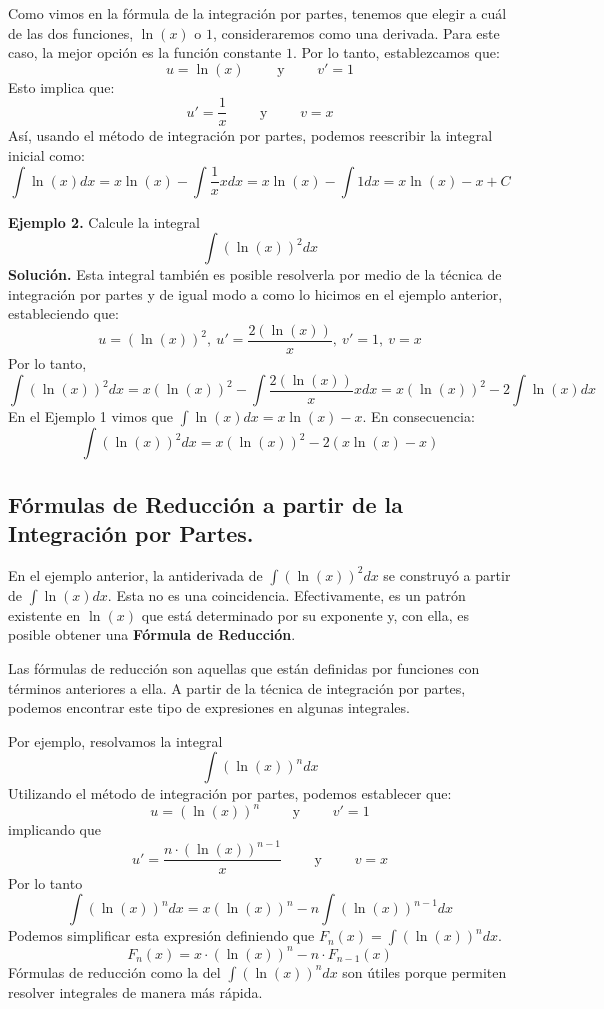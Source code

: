 \documentclass[12pt]{article}
\begin{document}
Como vimos en la fórmula de la integración por partes, tenemos que elegir a cuál de las dos funciones, $\ln(x)$ o $1$, consideraremos como una derivada. Para este caso, la mejor opción es la función constante $1$. Por lo tanto, establezcamos que:
\[
  u = \ln(x) \qquad \text{ y } \qquad v' = 1
\]
Esto implica que:
\[
  u' = \frac{1}{x} \qquad \text{ y } \qquad v = x
\]
Así, usando el método de integración por partes, podemos reescribir la integral inicial como:
\[
  \int \ln(x) dx = x \ln(x) - \int \frac{1}{x} x dx = x \ln(x) - \int 1 dx = x \ln(x) - x + C
\]

\textbf{Ejemplo 2.} Calcule la integral
\[
  \int (\ln(x))^{2} dx
\]
\textbf{Solución.} Esta integral también es posible resolverla por medio de la técnica de integración por partes y de igual modo a como lo hicimos en el ejemplo anterior, estableciendo que:
\[
  u = (\ln(x))^{2}, \ u' = \frac{2 (\ln(x))}{x}, \ v' = 1, \ v = x
\]
Por lo tanto,
\[
  \int (\ln(x))^{2} dx = x (\ln(x))^{2} - \int \frac{2 (\ln(x))}{x} x dx = x (\ln(x))^{2} - 2 \int \ln(x) dx
\]
En el Ejemplo 1 vimos que $\int \ln(x)dx = x \ln(x) - x$. En consecuencia:
\[
  \int (\ln(x))^{2} dx =  x (\ln(x))^{2} - 2 (x \ln(x) - x)
\]

\subsection{Fórmulas de Reducción a partir de la Integración por Partes.}

En el ejemplo anterior, la antiderivada de $\int (\ln(x))^{2} dx$ se construyó a partir de $\int \ln(x) dx$. Esta no es una coincidencia. Efectivamente, es un patrón existente en $\ln(x)$ que está determinado por su exponente y, con ella, es posible obtener una \textbf{Fórmula de Reducción}.

Las fórmulas de reducción son aquellas que están definidas por funciones con términos anteriores a ella. A partir de la técnica de integración por partes, podemos encontrar este tipo de expresiones en algunas integrales.

Por ejemplo, resolvamos la integral
\[
  \int (\ln(x))^{n}dx
\]
Utilizando el método de integración por partes, podemos establecer que:
\[
  u = (\ln(x))^{n} \qquad \text{ y } \qquad v' = 1
\]
implicando que
\[
  u' = \frac{n \cdot (\ln(x))^{n - 1}}{x} \qquad \text{ y } \qquad v = x
\]
Por lo tanto
\[
  \int (\ln(x))^{n}dx = x (\ln(x))^{n} - n \int (\ln(x))^{n - 1} dx
\]
Podemos simplificar esta expresión definiendo que $F_{n}(x) = \int (\ln(x))^{n} dx$.
\[
  F_{n}(x) = x \cdot (\ln(x))^{n} - n \cdot F_{n - 1}(x)
\]
Fórmulas de reducción como la del $\int (\ln(x))^{n} dx$ son útiles porque permiten resolver integrales de manera más rápida.
\end{document}

